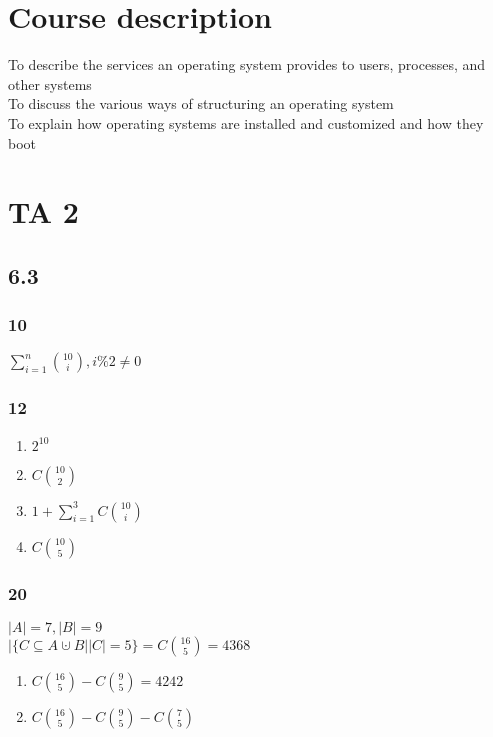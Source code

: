 \documentclass[a4paper,10pt,titlepage]{report}
\date{}
\begin{document}
\renewcommand{\thepage}{\roman{page}}%
\tableofcontents
\newpage
\setcounter{page}{1}
\renewcommand{\thepage}{\arabic{page}}
\section{Course description}
To describe the services an operating system provides to
users, processes, and other systems\\
To discuss the various ways of structuring an operating
system\\
To explain how operating systems are installed and
customized and how they boot\\
\newpage


\section{TA 2}

\subsection{6.3}
\subsubsection{10}
$ \sum\limits^n_{i=1}\binom{10}{i},i \% 2 \neq  	 0 $
\subsubsection{12}
\begin{enumerate}[label=(\alph*)]
\item $2^{10}$\\
\item $C \binom{10}{2}$
\item $1 + \sum\limits^3_{i=1} C\binom{10}{i}$
\item $ C\binom{10}{5} $

\end{enumerate}
\subsubsection{20}
$ |A| = 7, |B| = 9 $\\

$|\{C \subseteq A \cupdot B ||C|=5 \} =  C\binom{16}{5} = 4368 $
\\
\begin{enumerate}[label=(\alph*)]
\item $ C\binom{16}{5} - C\binom{9}{5} = 4242 $
\item $ C\binom{16}{5} - C\binom{9}{5} - {C\binom{7}{5}} $
\end{enumerate}
\end{document}
